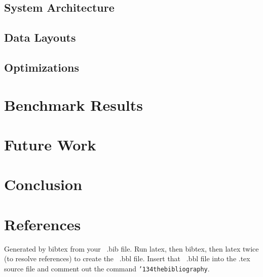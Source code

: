 \documentclass{sig-alternate}
\begin{document}
\subsection{System Architecture}

\subsection{Data Layouts}

\subsection{Optimizations}

\section{Benchmark Results}

\section{Future Work}

\section{Conclusion}

\section{References}
Generated by bibtex from your ~.bib file.  Run latex,
then bibtex, then latex twice (to resolve references)
to create the ~.bbl file.  Insert that ~.bbl file into
the .tex source file and comment out
the command \texttt{{\char'134}thebibliography}.
\end{document}
